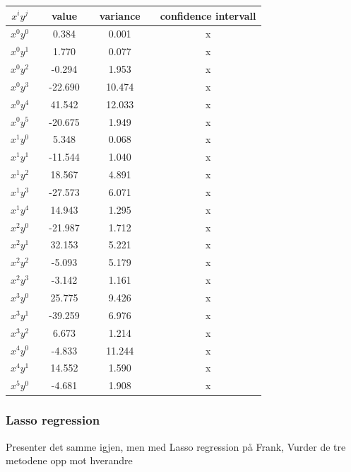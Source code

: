   \begin{center}
 \label{tab:Confidenceintervall_Ridge}
 \begin{tabularx}{\textwidth}{c X c X c X c }
     \hline
     \hline
     $x^iy^j$ && value && variance && confidence intervall \\
     \hline
$x^0y^0$     && 0.384    && 0.001   && x \\
$x^0y^1$     && 1.770    && 0.077   && x \\
$x^0y^2$     && -0.294   && 1.953   && x \\
$x^0y^3$     && -22.690  && 10.474  && x \\
$x^0y^4$     && 41.542   && 12.033  && x \\
$x^0y^5$     && -20.675  && 1.949   && x \\
$x^1y^0$     && 5.348    && 0.068   && x \\
$x^1y^1$     && -11.544  && 1.040   && x \\
$x^1y^2$     && 18.567   && 4.891   && x \\
$x^1y^3$     && -27.573  && 6.071   && x \\
$x^1y^4$     && 14.943   && 1.295   && x \\
$x^2y^0$     && -21.987  && 1.712   && x \\
$x^2y^1$     && 32.153   && 5.221   && x \\
$x^2y^2$     && -5.093   && 5.179   && x \\
$x^2y^3$     && -3.142   && 1.161   && x \\
$x^3y^0$     && 25.775   && 9.426   && x \\
$x^3y^1$     && -39.259  && 6.976   && x \\
$x^3y^2$     && 6.673    && 1.214   && x \\
$x^4y^0$     && -4.833   && 11.244  && x \\
$x^4y^1$     && 14.552   && 1.590   && x \\
$x^5y^0$     && -4.681   && 1.908   && x \\ 
    \hline
 \end{tabularx}
 \end{center}
 

\subsubsection{Lasso regression}
Presenter det samme igjen, men med Lasso regression  på Frank, Vurder de tre metodene opp mot hverandre 



